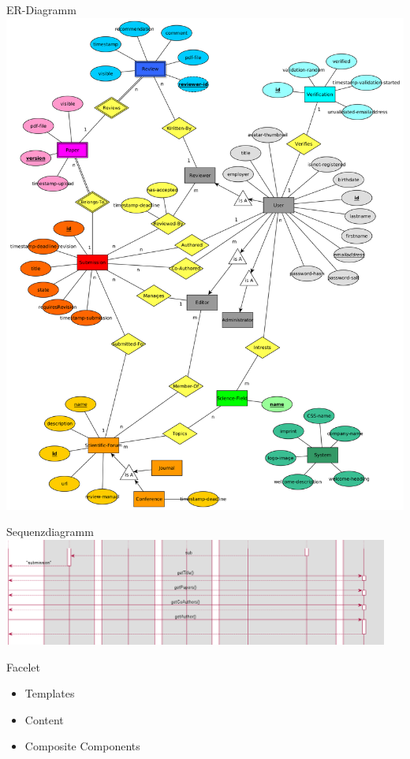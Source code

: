 \documentclass{beamer}
\begin{document}
    \begin{frame}{ER-Diagramm}
        \centering
        \includegraphics[height=0.9\textheight]{../../docs/Entwurf/graphics/ER-Modell.png}
    \end{frame}

    \begin{frame}{Sequenzdiagramm}
        \centering
        \includegraphics[width=0.95\textwidth]{excerpts/sequence1_3}
    \end{frame}

    \begin{frame}{Facelet}
        \begin{itemize}
            \item Templates
            \item Content
            \item Composite Components
        \end{itemize}
    \end{frame}
\end{document}
